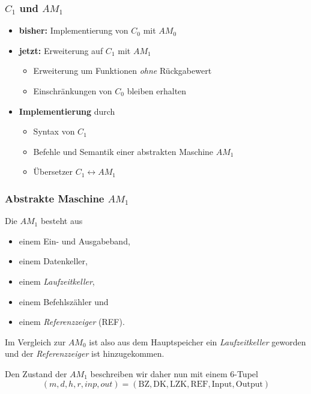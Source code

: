 \documentclass{beamer}
\renewcommand{\emph}[1]{\textbf{#1}}
\begin{document}
\begin{frame}[fragile] \frametitle{$C_1$ und $AM_1$}
	\begin{itemize}
		\item \emph{bisher:} Implementierung von $C_0$ mit $AM_0$
		\item \emph{jetzt:} Erweiterung auf $C_1$ mit $AM_1$ \pause
		\begin{itemize}
			\item Erweiterung um Funktionen \textit{ohne} Rückgabewert
			\item Einschränkungen von $C_0$ bleiben erhalten
		\end{itemize}
		\pause
		\item \emph{Implementierung} durch
		\begin{itemize}
			\item Syntax von $C_1$
			\item Befehle und Semantik einer abstrakten Maschine $AM_1$
			\item Übersetzer $C_1 \leftrightarrow AM_1$
		\end{itemize}
	\end{itemize}
\end{frame}

\begin{frame} \frametitle{Abstrakte Maschine $AM_1$}
	\footnotesize
	Die $AM_1$ besteht aus
	\begin{itemize}
		\item einem Ein- und Ausgabeband,
		\item einem Datenkeller,
		\item einem \textit{Laufzeitkeller},
		\item einem Befehlszähler und
		\item einem \textit{Referenzzeiger} (REF).
	\end{itemize}
	
	Im Vergleich zur $AM_0$ ist also aus dem Hauptspeicher ein \textit{Laufzeitkeller} geworden und der \textit{Referenzzeiger} ist hinzugekommen.
	
	Den Zustand der $AM_1$ beschreiben wir daher nun mit einem $6$-Tupel
	\begin{equation*}
		(m,d,h, r, inp,out) = (\text{BZ}, \text{DK}, \text{LZK}, \text{REF}, \text{Input}, \text{Output})
	\end{equation*}
\end{frame}
\end{document}
